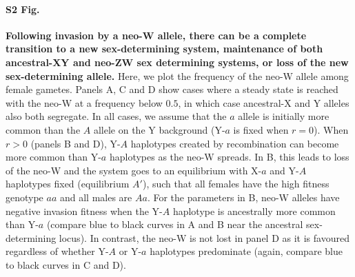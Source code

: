 \documentclass[10pt,letterpaper]{article}
\begin{document}
\paragraph*{S2 Fig.}
\label{fig:temporalOverdominance}
{\bf Following invasion by a neo-W allele, there can be a complete transition to a new sex-determining system, maintenance of both ancestral-XY and neo-ZW sex determining systems, or loss of the new sex-determining allele.}  
Here, we plot the frequency of the neo-W allele among female gametes.
Panels A, C and D show cases where a steady state is reached with the neo-W at a frequency below $0.5$, in which case ancestral-X and Y alleles also both segregate. 
In all cases, we assume that the $a$ allele is initially more common than the $A$ allele on the Y background (Y-$a$ is fixed when $r=0$). 
When $r>0$ (panels B and D), Y-$A$ haplotypes created by recombination can become more common than Y-$a$ haplotypes as the neo-W spreads.
In B, this leads to loss of the neo-W and the system goes to an equilibrium with X-$a$ and Y-$A$ haplotypes fixed (equilibrium $A'$), such that all females have the high fitness genotype $aa$ and all males are $Aa$. 
For the parameters in B, neo-W alleles have negative invasion fitness when the Y-$A$ haplotype is ancestrally more common than Y-$a$ (compare blue to black curves in A and  B near the ancestral sex-determining locus). 
In contrast, the neo-W is not lost in panel D as it is favoured regardless of whether Y-$A$ or Y-$a$ haplotypes predominate (again, compare blue to black curves in C and  D). 
\end{document}
